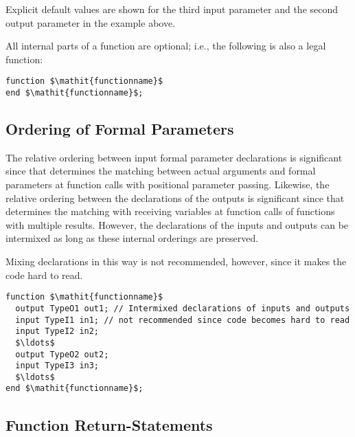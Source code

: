 \begin{nonnormative}
Explicit default values are shown for the third input parameter and the second output parameter in the example above.
\end{nonnormative}

\begin{nonnormative}
All internal parts of a function are optional; i.e., the following is also a legal function:
\begin{lstlisting}[language=modelica]
function $\mathit{functionname}$
end $\mathit{functionname}$;
\end{lstlisting}
\end{nonnormative}

\subsection{Ordering of Formal Parameters}\label{ordering-of-formal-parameters}

The relative ordering between input formal parameter declarations is significant since that determines the matching between actual arguments and formal parameters at function calls with positional parameter passing.
Likewise, the relative ordering between the declarations of the outputs is significant since that determines the matching with receiving variables at function calls of functions with multiple results.
However, the declarations of the inputs and outputs can be intermixed as long as these internal orderings are preserved.

\begin{nonnormative}
Mixing declarations in this way is not recommended, however, since it makes the code hard to read.
\end{nonnormative}

\begin{example}
\begin{lstlisting}[language=modelica]
function $\mathit{functionname}$
  output TypeO1 out1; // Intermixed declarations of inputs and outputs
  input TypeI1 in1; // not recommended since code becomes hard to read
  input TypeI2 in2;
  $\ldots$
  output TypeO2 out2;
  input TypeI3 in3;
  $\ldots$
end $\mathit{functionname}$;
\end{lstlisting}
\end{example}

\subsection{Function Return-Statements}\label{function-return-statements}

